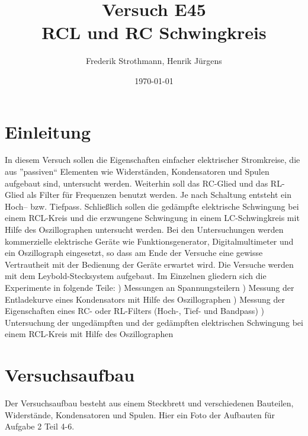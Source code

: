 \documentclass[12pt]{scrartcl}
\title{Versuch E45\\ RCL und RC Schwingkreis}
\author{Frederik Strothmann, Henrik Jürgens}
\date{\today}
\begin{document}

\maketitle
\newpage
\tableofcontents
\newpage


\section{Einleitung}

In diesem Versuch sollen die Eigenschaften einfacher elektrischer Stromkreise, die aus ”passiven“ Elementen wie
Widerständen, Kondensatoren und Spulen aufgebaut sind, untersucht werden. Weiterhin soll das RC-Glied und das
RL-Glied als Filter für Frequenzen benutzt werden. Je nach Schaltung entsteht ein Hoch– bzw. Tiefpass. Schließlich sollen die gedämpfte elektrische Schwingung bei einem RCL-Kreis und die erzwungene Schwingung
in einem LC-Schwingkreis mit Hilfe des Oszillographen untersucht werden. Bei den Untersuchungen werden kommerzielle elektrische Geräte wie Funktionsgenerator, Digitalmultimeter und ein Oszillograph eingesetzt, so dass am Ende der Versuche eine gewisse Vertrautheit mit der Bedienung der Geräte erwartet wird. Die Versuche werden mit dem Leybold-Stecksystem aufgebaut. Im Einzelnen gliedern sich die Experimente in folgende Teile:
)
Messungen an Spannungsteilern
)
Messung der Entladekurve eines Kondensators mit Hilfe des Oszillographen
)
Messung der Eigenschaften eines RC- oder RL-Filters (Hoch-, Tief- und Bandpass)
)
Untersuchung der ungedämpften und der gedämpften elektrischen Schwingung bei einem RCL-Kreis mit Hilfe des Oszillographen

\section{Versuchsaufbau}
Der Versuchsaufbau besteht aus einem Steckbrett und verschiedenen Bauteilen, Widerstände, Kondensatoren und Spulen.
Hier ein Foto der Aufbauten für Aufgabe 2 Teil 4-6.
\end{document}
